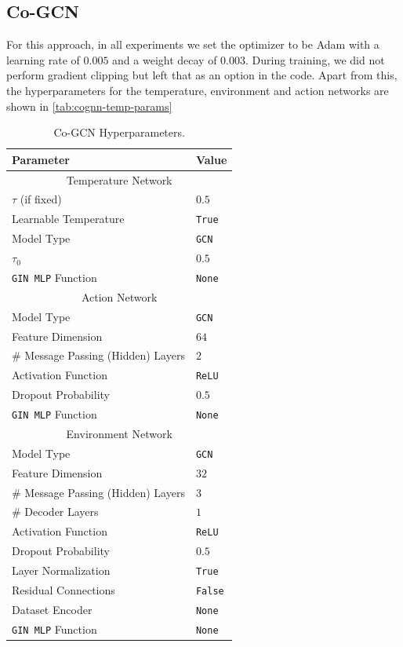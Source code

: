 \documentclass{gdl}
\begin{document}
\subsection{Co-GCN}
\label{lab:hyper-Co-GCN}
For this approach, in all experiments we set the optimizer to be Adam with a learning rate of $0.005$ and a weight decay of $0.003$. During training, we did not perform gradient clipping but left that as an option in the code. Apart from this, the hyperparameters for the temperature, environment and action networks are shown in \autoref{tab:cognn-temp-params} 

\begin{table}[h]
    \small\sf\centering
    \caption{Co-GCN Hyperparameters.}
    \begin{tabular}{ll}
        \toprule
        Parameter & Value \\
        \midrule
        \multicolumn{2}{c}{Temperature Network} \\
        \midrule
        $\tau$ (if fixed) & $0.5$ \\
        Learnable Temperature & \texttt{True} \\
        Model Type & \texttt{GCN} \\
        $\tau_{0}$ & $0.5$ \\
        \texttt{GIN MLP} Function & \texttt{None} \\
        \midrule
        \multicolumn{2}{c}{Action Network} \\
        \midrule
        Model Type & \texttt{GCN} \\
        Feature Dimension & $64$ \\
        \# Message Passing (Hidden) Layers & $2$ \\
        Activation Function & \texttt{ReLU} \\
        Dropout Probability & $0.5$ \\
        \texttt{GIN MLP} Function & \texttt{None} \\
        \midrule
        \multicolumn{2}{c}{Environment Network} \\
        \midrule
        Model Type & \texttt{GCN} \\
        Feature Dimension & $32$ \\
        \# Message Passing (Hidden) Layers & $3$ \\
        \# Decoder Layers & $1$ \\
        Activation Function & \texttt{ReLU} \\
        Dropout Probability & $0.5$ \\
        Layer Normalization & \texttt{True} \\
        Residual Connections & \texttt{False} \\
        Dataset Encoder & \texttt{None} \\
        \texttt{GIN MLP} Function & \texttt{None} \\
        \bottomrule 
    \end{tabular}
    \label{tab:cognn-temp-params}
\end{table}
\end{document}

